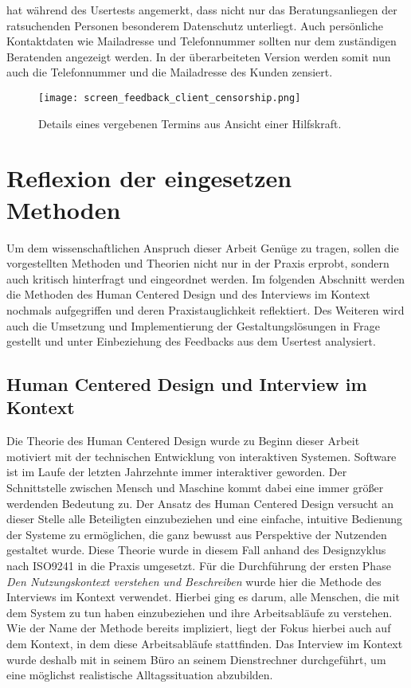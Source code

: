 \ipName hat während des Usertests angemerkt, dass nicht nur das Beratungsanliegen der ratsuchenden Personen besonderem Datenschutz unterliegt. Auch persönliche Kontaktdaten wie Mailadresse und Telefonnummer sollten nur dem zuständigen Beratenden angezeigt werden. In der überarbeiteten Version werden somit nun auch die Telefonnummer und die Mailadresse des Kunden zensiert.

\begin{figure}[H]
    \caption{Details eines vergebenen Termins aus Ansicht einer Hilfskraft.}
    \centering
    \texttt{[image: screen\_feedback\_client\_censorship.png]}
\end{figure}

\section{Reflexion der eingesetzen Methoden}
\label{subsection:reflection}

Um dem wissenschaftlichen Anspruch dieser Arbeit Genüge zu tragen, sollen die
vorgestellten Methoden und Theorien nicht nur in der Praxis erprobt, sondern
auch kritisch hinterfragt und eingeordnet werden. Im folgenden Abschnitt werden
die Methoden des Human Centered Design und des Interviews im Kontext nochmals
aufgegriffen und deren Praxistauglichkeit reflektiert. Des Weiteren wird auch
die Umsetzung und Implementierung der Gestaltungslösungen in Frage gestellt und
unter Einbeziehung des Feedbacks aus dem Usertest analysiert.

\subsection*{Human Centered Design und Interview im Kontext}
Die Theorie des Human Centered Design wurde zu Beginn dieser Arbeit motiviert
mit der technischen Entwicklung von interaktiven Systemen. Software ist im
Laufe der letzten Jahrzehnte immer interaktiver geworden. Der Schnittstelle
zwischen Mensch und Maschine kommt dabei eine immer größer werdenden Bedeutung
zu\cite{hci}. Der Ansatz des Human Centered Design versucht an dieser Stelle
alle Beteiligten einzubeziehen und eine einfache, intuitive Bedienung der
Systeme zu ermöglichen, die ganz bewusst aus Perspektive der Nutzenden
gestaltet wurde\cite{sequenceDiagrams}. Diese Theorie wurde in diesem Fall
anhand des Designzyklus nach ISO9241 in die Praxis umgesetzt. Für die
Durchführung der ersten Phase \textit{Den Nutzungskontext verstehen und
    Beschreiben} wurde hier die Methode des Interviews im Kontext verwendet.
Hierbei ging es darum, alle Menschen, die mit dem System zu tun haben
einzubeziehen und ihre Arbeitsabläufe zu verstehen. Wie der Name der Methode
bereits impliziert, liegt der Fokus hierbei auch auf dem Kontext, in dem diese
Arbeitsabläufe stattfinden\cite{hciHandbook}. Das Interview im Kontext wurde
deshalb mit \ipName in seinem Büro an seinem Dienstrechner durchgeführt, um eine
möglichst realistische Alltagssituation abzubilden.

